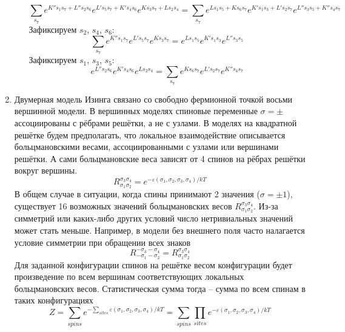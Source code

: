 \documentclass[12pt]{article}
\theoremstyle{definition}
\begin{document}
\begin{enumerate}
\begin{itemize}
\begin{equation}
            \sum\limits_{s_7}e^{K''s_1s_7+L''s_2s_6}e^{L's_5s_7+K's_4s_6}e^{Ks_3s_7+Ls_2s_4}=\sum\limits_{s_7}e^{Ls_1s_5+Ks_6s_7}e^{K's_1s_3+L's_2s_7}e^{L''s_3s_5+K''s_4s_7}
        \end{equation}
        Зафиксируем $s_2$, $s_4$, $s_6$:
        \begin{equation}
            \boxed{\sum\limits_{s_7}e^{K''s_1s_7}e^{L's_5s_7}e^{Ks_3s_7}=e^{Ls_1s_5}e^{K's_1s_3}e^{L''s_3s_5}}
        \end{equation}
        Зафиксируем $s_1$, $s_3$, $s_5$:
        \begin{equation}
            \boxed{e^{L''s_2s_6}e^{K's_4s_6}e^{Ls_2s_4}=\sum\limits_{s_7}e^{Ks_6s_7}e^{L's_2s_7}e^{K''s_4s_7}}
        \end{equation}
    \end{itemize}
    \item Двумерная модель Изинга связано со свободно фермионной точкой восьми вершинной модели. В вершинных моделях спиновые переменные $\sigma=\pm$ ассоциированы с рёбрами решётки, а не с узлами. В моделях на квадратной решётке будем предполагать, что локальное взаимодействие описывается больцмановскими весами, ассоциированными с узлами или вершинами решётки. А сами больцмановские веса зависят от 4 спинов на рёбрах решётки вокруг вершины.
    \begin{equation}
        R^{\sigma_3\sigma_4}_{\sigma_1\sigma_2}=e^{-\varepsilon(\sigma_1,\sigma_2,\sigma_3,\sigma_4)/kT}
    \end{equation}
    В общем случае в ситуации, когда спины принимают 2 значения ($\sigma=\pm1$), существует 16 возможных значений больцмановских весов $R_{\sigma_1\sigma_2}^{\sigma_3\sigma_4}$. Из-за симметрий или каких-либо других условий число нетривиальных значений может стать меньше. Например, в модели без внешнего поля часто налагается условие симметрии при обращении всех знаков
    \begin{equation}
        R^{-\sigma_3-\sigma_4}_{-\sigma_1-\sigma_2}=R^{\sigma_3\sigma_4}_{\sigma_1\sigma_2}
    \end{equation}
    Для заданной конфигурации спинов на решётке весом конфигурации будет произведение по всем вершинам соответствующих локальных больцмановских весов. Статистическая сумма тогда -- сумма по всем спинам в таких конфигурациях
    \begin{equation}
        Z=\sum\limits_{spins}e^{-\sum\limits_{sites}\varepsilon(\sigma_1,\sigma_2,\sigma_3,\sigma_4)/kT}=\sum\limits_{spins}\prod_{sites}e^{-\varepsilon(\sigma_1,\sigma_2,\sigma_3,\sigma_4)/kT}

\end{equation}
\end{enumerate}
\end{document}
